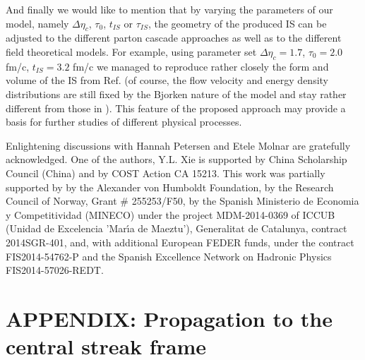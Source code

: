 \documentclass[aps,prc,twocolumn,floatfix,showpacs,a4paper,
nofootinbib,amsmath,amssymb]{revtex4-1}
\begin{document}
And finally we would like to mention that by varying the parameters of our model, namely $\Delta \eta_c$, $\tau_0$, $t_{IS}$ or $\tau_{IS}$, the geometry of the produced IS can be adjusted to the different parton cascade approaches as well as to the different field theoretical models. For example, using parameter set $\Delta \eta_c=1.7$, $\tau_0=2.0$ fm/c, $t_{IS}=3.2$ fm/c  we managed to reproduce rather closely the form and volume of the IS from Ref. \cite{M2002} (of course, the flow velocity and energy density distributions are still fixed by the Bjorken nature of the model and stay rather different from those in \cite{M2002}). This feature of the proposed approach may provide a basis for further studies of different 
physical processes.



\begin{acknowledgments}

Enlightening discussions with Hannah Petersen and Etele Molnar
are gratefully acknowledged.
One of the authors, Y.L. Xie 
is supported by China Scholarship Council (China) 
and by COST Action CA 15213. 
This work was partially supported by 
by the Alexander von Humboldt Foundation,
by the Research Council of Norway, Grant \# 255253/F50, 
by the Spanish Ministerio de Economia y Competitividad (MINECO) under the project MDM-2014-0369 of ICCUB (Unidad de Excelencia 'Mar\'\i a de Maeztu'), Ge\-ne\-ra\-li\-tat de Catalunya, contract 2014SGR-401,
and, with additional European FEDER funds, under the contract FIS2014-54762-P and the Spanish Excellence Network on Hadronic Physics FIS2014-57026-REDT.



\end{acknowledgments}

\section*{APPENDIX: Propagation to the central streak frame}
\end{document}
